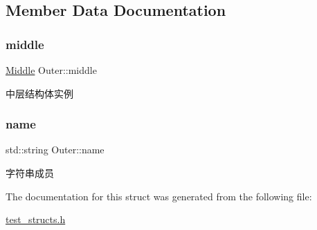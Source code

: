 \subsection{Member Data Documentation}
\mbox{\label{structOuter_adc81b43edf9dbacead62a66d84ea8165}} 
\subsubsection{\texorpdfstring{middle}{middle}}
{\footnotesize\ttfamily \hyperlink{structMiddle}{Middle} Outer\+::middle}



中层结构体实例 

\mbox{\label{structOuter_a59d89e71f28671cdc6213f0db73d4034}} 
\subsubsection{\texorpdfstring{name}{name}}
{\footnotesize\ttfamily std\+::string Outer\+::name}



字符串成员 



The documentation for this struct was generated from the following file\+:\begin{DoxyCompactItemize}
\item 
\hyperlink{test__structs_8h}{test\+\_\+structs.\+h}\end{DoxyCompactItemize}
